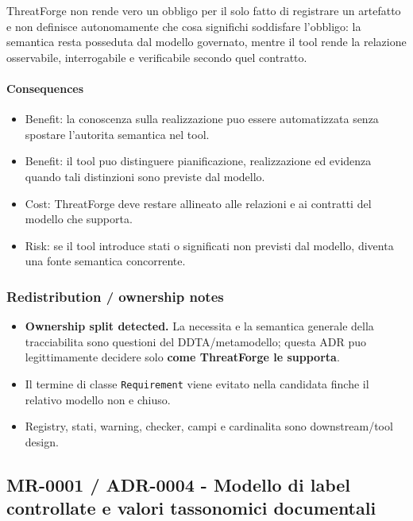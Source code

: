 \documentclass[
  10pt,
]{article}
\providecommand{\tightlist}{%
  \setlength{\itemsep}{0pt}\setlength{\parskip}{0pt}}
\begin{document}
ThreatForge non rende vero un obbligo per il solo fatto di registrare un
artefatto e non definisce autonomamente che cosa significhi soddisfare
l'obbligo: la semantica resta posseduta dal modello governato, mentre il
tool rende la relazione osservabile, interrogabile e verificabile
secondo quel contratto.

\paragraph{Consequences}\label{consequences-5}

\begin{itemize}
\tightlist
\item
  Benefit: la conoscenza sulla realizzazione puo essere automatizzata
  senza spostare l'autorita semantica nel tool.
\item
  Benefit: il tool puo distinguere pianificazione, realizzazione ed
  evidenza quando tali distinzioni sono previste dal modello.
\item
  Cost: ThreatForge deve restare allineato alle relazioni e ai contratti
  del modello che supporta.
\item
  Risk: se il tool introduce stati o significati non previsti dal
  modello, diventa una fonte semantica concorrente.
\end{itemize}

\subsubsection{Redistribution / ownership
notes}\label{redistribution-ownership-notes-2}

\begin{itemize}
\tightlist
\item
  \textbf{Ownership split detected.} La necessita e la semantica
  generale della tracciabilita sono questioni del DDTA/metamodello;
  questa ADR puo legittimamente decidere solo \textbf{come ThreatForge
  le supporta}.
\item
  Il termine di classe \texttt{Requirement} viene evitato nella
  candidata finche il relativo modello non e chiuso.
\item
  Registry, stati, warning, checker, campi e cardinalita sono
  downstream/tool design.
\end{itemize}

\subsection{MR-0001 / ADR-0004 - Modello di label controllate e valori
tassonomici
documentali}\label{mr-0001-adr-0004---modello-di-label-controllate-e-valori-tassonomici-documentali}
\end{document}
